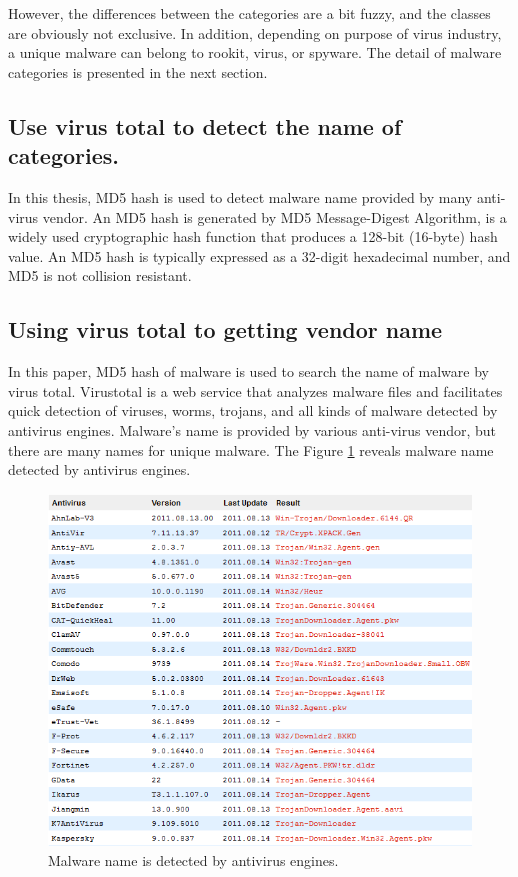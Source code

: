 However, the differences between the categories are a bit fuzzy, and the classes are obviously not exclusive. In addition, depending on purpose of virus industry, a unique malware can belong to rookit, virus, or spyware. The detail of malware categories is presented in the next section. 
\subsection{Use virus total to detect the name of categories.}

In this thesis, MD5 hash is used to detect malware name provided by many anti-virus vendor. An MD5 hash is generated by MD5 Message-Digest Algorithm, is a widely used cryptographic hash function that produces a 128-bit (16-byte) hash value. An MD5 hash is typically expressed as a 32-digit hexadecimal number, and MD5 is not collision resistant\cite{wiki1}.

\subsection{Using virus total to getting vendor name}
In this paper, MD5 hash of malware is used to search the name of malware by virus total. Virustotal is a web service that analyzes malware files and facilitates quick detection of viruses, worms, trojans, and all kinds of malware detected by antivirus engines. Malware's name is provided by various anti-virus vendor, but there are many names for unique malware. The Figure \ref{fig:virustotal_listname} reveals malware name detected by antivirus engines. 
\begin{figure}[h!]
\centering
\includegraphics[width=1.0\textwidth]{graph/virustotal_listname.png}
\caption{Malware name is detected by antivirus engines.}
\label{fig:virustotal_listname}
\end{figure}
